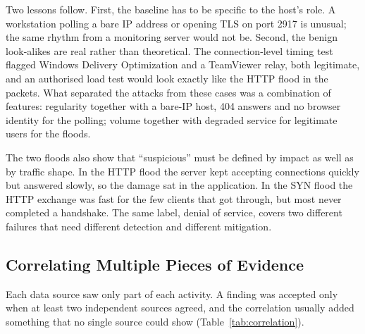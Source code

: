 Two lessons follow. First, the baseline has to be specific to the host's role. A workstation polling a bare IP address or opening TLS on port 2917 is unusual; the same rhythm from a monitoring server would not be. Second, the benign look-alikes are real rather than theoretical. The connection-level timing test flagged Windows Delivery Optimization and a TeamViewer relay, both legitimate, and an authorised load test would look exactly like the HTTP flood in the packets. What separated the attacks from these cases was a combination of features: regularity together with a bare-IP host, 404 answers and no browser identity for the polling; volume together with degraded service for legitimate users for the floods.

The two floods also show that ``suspicious'' must be defined by impact as well as by traffic shape. In the HTTP flood the server kept accepting connections quickly but answered slowly, so the damage sat in the application. In the SYN flood the HTTP exchange was fast for the few clients that got through, but most never completed a handshake. The same label, denial of service, covers two different failures that need different detection and different mitigation.

\subsection{Correlating Multiple Pieces of Evidence}

Each data source saw only part of each activity. A finding was accepted only when at least two independent sources agreed, and the correlation usually added something that no single source could show (Table~\ref{tab:correlation}).

